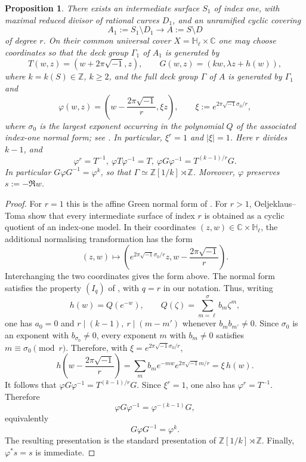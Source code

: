 \documentclass[10pt,a4paper]{amsart}
\numberwithin{equation}{section}
\newtheorem{propo}{Proposition}
\begin{document}
 \begin{propo}\label{prop:higher-index-green-model}
There exists an intermediate surface $S_1$ of index one, with maximal reduced divisor of rational curves $D_1$, and an unramified cyclic covering
$$
A_1:=S_1\setminus D_1\longrightarrow A:=S\setminus D
$$
of degree $r$. On their common universal cover $X=\mathbb H_\ell\times\mathbb C$ one may choose coordinates so that the deck group $\Gamma_1$ of $A_1$ is generated by
$$
T(w,z)=(w+2\pi\sqrt{-1},z),\qquad
G(w,z)=(kw,\lambda z+h(w)),
$$
where $k=k(S)\in\mathbb Z$, $k\geq2$, and the full deck group $\Gamma$ of $A$ is generated by $\Gamma_1$ and
$$
\varphi(w,z)=\left(w-\frac{2\pi\sqrt{-1}}{r},\xi z\right),
\qquad
\xi:=e^{2\pi\sqrt{-1}\sigma_0/r},
$$
where $\sigma_0$ is the largest exponent occurring in the polynomial $Q$ of the associated index-one normal form; see \cite[Sections~3.1--3.2]{oeljeklaus-toma-moduli}. In particular, $\xi^r=1$ and $|\xi|=1$.
Here $r$ divides $k-1$, and
$$
\varphi^r=T^{-1},\ 
\varphi T\varphi^{-1}=T,\ 
\varphi G\varphi^{-1}=T^{(k-1)/r}G.
$$
In particular $G\varphi G^{-1}=\varphi^k$, so that
$\Gamma\simeq\mathbb Z[1/k]\rtimes\mathbb Z$. Moreover, $\varphi$ preserves
$s:=-\Re w$.
\end{propo}

\begin{proof}
For $r=1$ this is the affine Green normal form of
\cite{dloussky-oeljeklaus-toma}. For $r>1$, Oeljeklaus--Toma
\cite[Section~3.2 and Remark~4.4]{oeljeklaus-toma-moduli} show that every
intermediate surface of index $r$ is obtained as a cyclic quotient of an
index-one model. In their coordinates $(z,w)\in\mathbb C\times\mathbb H_\ell$,
the additional normalising transformation has the form
$$
(z,w)\longmapsto
\left(e^{2\pi\sqrt{-1}\sigma_0/r}z,
w-\frac{2\pi\sqrt{-1}}{r}\right).
$$
Interchanging the two coordinates gives the form above. 
The normal form satisfies the property $(I_q)$ of
\cite[Section~3.2, p.~329]{oeljeklaus-toma-moduli}, with $q=r$ in our notation. Thus, writing
$$
h(w)=Q(e^{-w}),\qquad Q(\zeta)=\sum_{m=\ell}^{\sigma} b_m\zeta^m,
$$
one has $a_0=0$ and
$
r\mid(k-1),\ r\mid(m-m')
$
whenever $b_m b_{m'}\neq0$. Since $\sigma_0$ is an exponent with $b_{\sigma_0}\neq0$, every exponent $m$ with $b_m\neq0$ satisfies
$
m\equiv\sigma_0\pmod r.
$
Therefore, with $\xi=e^{2\pi\sqrt{-1}\sigma_0/r}$,
$$
h\left(w-\frac{2\pi\sqrt{-1}}{r}\right)
=
\sum_m b_m e^{-mw}e^{2\pi\sqrt{-1}m/r}
=
\xi\,h(w).
$$
It follows that
$
\varphi G\varphi^{-1}=T^{(k-1)/r}G.
$
Since $\xi^r=1$, one also has $\varphi^r=T^{-1}$. Therefore
$$
\varphi G\varphi^{-1}=\varphi^{-(k-1)}G,
$$
equivalently
$$
G\varphi G^{-1}=\varphi^k.
$$
The resulting presentation is the standard presentation of
$\mathbb Z[1/k]\rtimes\mathbb Z$. Finally, $\varphi^*s=s$ is immediate.
\end{proof}
\end{document}
